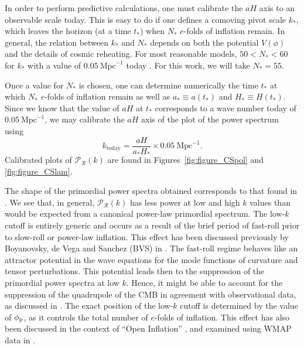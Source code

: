 In order to perform predictive calculations, one must calibrate the $aH$ axis to an observable scale today. This is easy to do if one defines a comoving pivot scale $k_*$, which leaves the horizon (at a time $t_*$) when $N_*$ $e$-folds of inflation remain. In general, the relation between $k_*$ and $N_*$ depends on both the potential $V(\phi)$ and the details of cosmic reheating. For most reasonable models, $50<N_*<60$  for $k_*$ with a value of $0.05\:\mathrm{Mpc}^{-1}$ today \citep{planck_collaboration_planck_2013-1}. For this work, we will take $N_*=55$. 

Once a value for $N_*$ is chosen, one can determine numerically the time $t_*$ at which $N_*$ $e$-folds of inflation remain as well as $a_*\equiv a(t_*)$ and $H_*\equiv H(t_*)$. Since we know that the value of $aH$ at $t_*$ corresponds to a wave number today of $0.05\:\mathrm{Mpc}^{-1}$, we may calibrate the $aH$ axis of the plot of the power spectrum using
%
\begin{equation}
  k_\mathrm{today} 
  = 
  \frac{aH}{a_*H_*}\times0.05\:\mathrm{Mpc}^{-1}.
\end{equation}
%
Calibrated plots of $\mathcal{P}_\mathcal{R}(k)$ are found in Figures~\ref{fig:figure_CSpol} and \nolinebreak\ref{fig:figure_CSlam}. 



The shape of the primordial power spectra obtained corresponds to that found in \citep{lasenby_closed_2003}. We see that, in general, $\mathcal{P}_\mathcal{R}(k)$ has less power at low and high $k$ values than would be expected from a canonical power-law primordial spectrum.  The low-$k$ cutoff is entirely generic and occurs as a result of the brief period of fast-roll prior to slow-roll or power-law inflation.  This effect has been discussed previously by Boyanovsky, de Vega and Sanchez (BVS) in \citep{boyanovsky_cmb_2006}. The fast-roll regime behaves like an attractor potential in the wave equations for the mode functions of curvature and tensor perturbations. This potential leads then to the suppression of the primordial power spectra at low $k$.  Hence, it might be able to account for the suppression of the quadrupole of the CMB in agreement with observational data, as discussed in \citep{boyanovsky_cmb_2006-1}.  The exact position of the low-$k$ cutoff is determined by the value of $\phi_{\mathrm{p}}$, as it controls the total number of $e$-folds of inflation. This effect has also been discussed in the context of ``Open Inflation'' \citep{Yamauchi_strings_2011,Linde_open_1999,Linde_toy_1999}, and examined using WMAP data in \citet{Contaldi_suppress_2003}.

